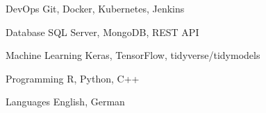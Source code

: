

\begin{cvskills}

  \cvskill
    {DevOps} %
    {Git, Docker, Kubernetes, Jenkins} %

  \cvskill
    {Database} %
    {SQL Server, MongoDB, REST API} %
    
  \cvskill
    {Machine Learning} %
    {Keras, TensorFlow, tidyverse/tidymodels} %

  \cvskill
    {Programming} %
    {R, Python, C++} %

  \cvskill
    {Languages} %
    {English, German} %

\end{cvskills}
